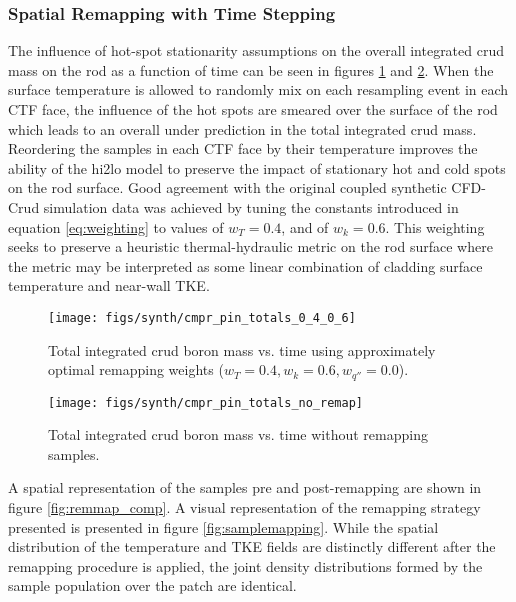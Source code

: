 \subsubsection{Spatial Remapping with Time Stepping}

The influence of hot-spot stationarity assumptions on the overall integrated crud mass on the rod as a function of time can be seen in figures \ref{fig:cmprpintotals0406} and \ref{fig:cmprpintotalsnoremap}.  When the surface temperature is allowed to randomly mix on each resampling event in each CTF face, the influence of the hot spots are smeared over the surface of the rod which leads to an overall under prediction in the total integrated crud mass.  Reordering the samples in each CTF face by their temperature improves the ability of the hi2lo model to preserve the impact of stationary hot and cold spots on the rod surface.  Good agreement with the original coupled synthetic CFD-Crud simulation data was achieved by tuning the constants introduced in equation \ref{eq:weighting} to values of $w_T = 0.4$, and of $w_k = 0.6$.  This weighting seeks to preserve a heuristic thermal-hydraulic metric on the rod surface  where the metric may be interpreted as some linear combination of cladding surface temperature and near-wall TKE. 


\begin{figure}[H]
    \centering
    \texttt{[image: figs/synth/cmpr\_pin\_totals\_0\_4\_0\_6]}
    \caption[Total integrated crud boron mass vs. time using approximately optimal remapping weights.]{Total integrated crud boron mass vs. time using approximately optimal remapping weights ($w_T=0.4, w_{k}=0.6, w_{q''}=0.0$).}
    \label{fig:cmprpintotals0406}
\end{figure}
\begin{figure}[H]
    \centering
    \texttt{[image: figs/synth/cmpr\_pin\_totals\_no\_remap]}
    \caption{Total integrated crud boron mass vs. time without remapping samples.}
    \label{fig:cmprpintotalsnoremap}
\end{figure}

A spatial representation of the samples pre and post-remapping are shown in figure \ref{fig:remmap_comp}.  A visual representation of the remapping strategy presented is presented in figure \ref{fig:samplemapping}.  While the spatial distribution of the temperature and TKE fields are distinctly different after the remapping procedure is applied, the joint density distributions formed by the sample population over the patch are identical. 


